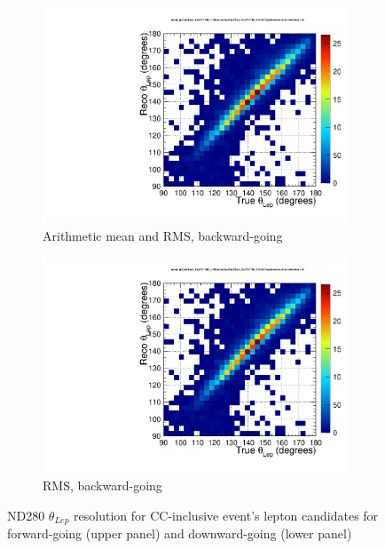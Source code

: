 \begin{figure}[h]
\begin{subfigure}[t]{0.49\textwidth}
	\includegraphics[width=\textwidth, trim={0mm 0mm 17mm 0mm}, clip,page=2]{figures/det/resolution/LepCandTrue_And_Reco_Th_backward_ForJacob}
	\caption{Arithmetic mean and RMS, backward-going}
\end{subfigure}
\begin{subfigure}[t]{0.49\textwidth}
	\includegraphics[width=\textwidth, trim={0mm 0mm 17mm 0mm}, clip,page=4]{figures/det/resolution/LepCandTrue_And_Reco_Th_backward_ForJacob}
	\caption{RMS, backward-going}
\end{subfigure}
	\caption{ND280 $\theta_{Lep}$ resolution for CC-inclusive event's lepton candidates for forward-going (upper panel) and downward-going (lower panel)}
	\label{fig:detector_resolution_thetamu}
\end{figure}